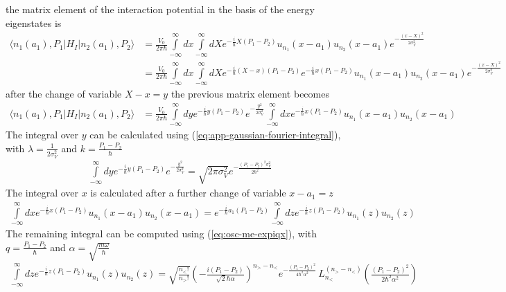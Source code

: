 the matrix element of the interaction potential in the basis of the energy eigenstates is
\begin{align}
  \langle n_1(a_1), P_1|H_I|n_2(a_1),P_2\rangle & = \frac{V_0}{2\pi\hbar}\int \limits_{-\infty}^{\infty} dx\int \limits_{-\infty}^{\infty} dX e^{-\frac{i}{\hbar}X(P_1-P_2)}u_{n_1}(x-a_1)u_{n_2}(x-a_1)e^{-\frac{(x-X)^2}{2\sigma_V^2}}\nonumber                         \\
                                                & =\frac{V_0}{2\pi\hbar}\int \limits_{-\infty}^{\infty} dx\int \limits_{-\infty}^{\infty} dX e^{-\frac{i}{\hbar}(X-x)(P_1-P_2)}e^{-\frac{i}{\hbar}x(P_1-P_2)}u_{n_1}(x-a_1)u_{n_2}(x-a_1)e^{-\frac{(x-X)^2}{2\sigma_V^2}}
\end{align}
after the change of variable $X-x=y$ the previous matrix element becomes
\begin{align}
  \langle n_1(a_1), P_1|H_I|n_2(a_1),P_2\rangle & = \frac{V_0}{2\pi\hbar}\int \limits_{-\infty}^{\infty} dy e^{-\frac{i}{\hbar}y(P_1-P_2)}e^{-\frac{y^2}{2\sigma_V^2}}\int \limits_{-\infty}^{\infty} dx e^{-\frac{i}{\hbar}x(P_1-P_2)}u_{n_1}(x-a_1)u_{n_2}(x-a_1)
\end{align}
The integral over $y$ can be calculated using (\ref{eq:app-gaussian-fourier-integral}), with $\lambda = \frac1{2\sigma_V^2}$ and $k = \frac{P_1-P_2}{\hbar}$
\begin{align}
  \int \limits_{-\infty}^{\infty} dy e^{-\frac{i}{\hbar}y(P_1-P_2)}e^{-\frac{y^2}{2\sigma_V^2}} = \sqrt{{2\pi\sigma_V^2}} e^{-\frac{(P_1-P_2)^2\sigma_V^2}{2\hbar^2}}
\end{align}
The integral over $x$ is calculated after a further change of variable $x-a_1=z$
\begin{align}
  \int \limits_{-\infty}^{\infty} dx e^{-\frac{i}{\hbar}x(P_1-P_2)}u_{n_1}(x-a_1)u_{n_2}(x-a_1) = e^{-\frac{i}{\hbar}a_1(P_1-P_2)}\int \limits_{-\infty}^{\infty} dz e^{-\frac{i}{\hbar}z(P_1-P_2)}u_{n_1}(z)u_{n_2}(z)
\end{align}
The remaining integral can be computed using (\ref{eq:osc-me-expiqx}), with $q = \frac{P_1-P_2}{\hbar}$ and $\alpha = \sqrt{\frac{m\omega}{\hbar}}$
\begin{align}
  \int \limits_{-\infty}^{\infty} dz e^{-\frac{i}{\hbar}z(P_1-P_2)}u_{n_1}(z)u_{n_2}(z) = \sqrt{\frac{n_<!}{n_>!}} \left(-\frac{i (P_1-P_2)  }{\sqrt{2}\hbar\alpha}\right)^{n_> - n_<} e^{-\frac{(P_1-P_2)^2 }{4\hbar^2\alpha^2}} \, L_{n_<}^{(n_> - n_<)}\!\left(\frac{(P_1-P_2)^2 }{2\hbar^2\alpha^2}\right)
\end{align}

